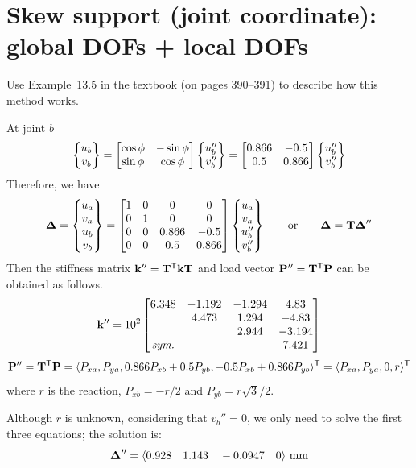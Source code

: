 \section{Skew support (joint coordinate): global DOFs + local DOFs}
Use Example~13.5 in the textbook (on pages 390--391) to describe how this method works.
\begin{fig}
  
\end{fig}
At joint $b$
\begin{equation*}
  \begin{Bmatrix}u_b\\ v_b\end{Bmatrix} = \begin{bmatrix}\cos\phi & -\sin\phi\\ \sin\phi & \cos\phi\end{bmatrix}\begin{Bmatrix}u_b''\\ v_b''\end{Bmatrix} = \begin{bmatrix}0.866 & -0.5\\ 0.5 & 0.866\end{bmatrix}\begin{Bmatrix}u_b''\\ v_b''\end{Bmatrix}
\end{equation*}
Therefore, we have
\begin{equation*}
  \bm{\Delta} = \begin{Bmatrix}u_a\\ v_a\\ u_b\\ v_b\end{Bmatrix} = \begin{bmatrix}1 & 0 & 0 & 0\\ 0 & 1 & 0 & 0\\ 0 & 0 & 0.866 & -0.5\\ 0 & 0 & 0.5 & 0.866\end{bmatrix}\begin{Bmatrix}u_a\\ v_a\\ u_b''\\ v_b''\end{Bmatrix}\qquad\text{or}\qquad \bm{\Delta} = \mathbf{T}\bm{\Delta}''
\end{equation*}
Then the stiffness matrix $\mathbf{k}'' = \mathbf{T}^{\mathsf{T}}\mathbf{k}\mathbf{T}$ and load vector $\mathbf{P}'' = \mathbf{T}^{\mathsf{T}}\mathbf{P}$ can be obtained as follows.
\begin{equation*}
  \mathbf{k}'' = 10^2\begin{bmatrix}6.348 & -1.192 & -1.294 & 4.83\\ & 4.473 & 1.294 & -4.83\\ & & 2.944 & -3.194\\ \textit{sym.} & & & 7.421\end{bmatrix}
\end{equation*}
\begin{equation*}
  \mathbf{P}'' = \mathbf{T}^{\mathsf{T}}\mathbf{P} = \langle P_{xa}, P_{ya}, 0.866P_{xb} + 0.5P_{yb}, -0.5P_{xb} + 0.866P_{yb}\rangle^{\mathsf{T}} = \langle P_{xa}, P_{ya}, 0, r\rangle^{\mathsf{T}}
\end{equation*}
where $r$ is the reaction, $P_{xb} = -r/2$ and $P_{yb} = r\sqrt3/2$.

Although $r$ is unknown, considering that $v_b'' = 0$, we only need to solve the first three equations; the solution is:
\begin{equation*}
  \bm{\Delta}'' = \langle 0.928\quad 1.143\quad -0.0947\quad 0\rangle\ \text{mm}
\end{equation*}


